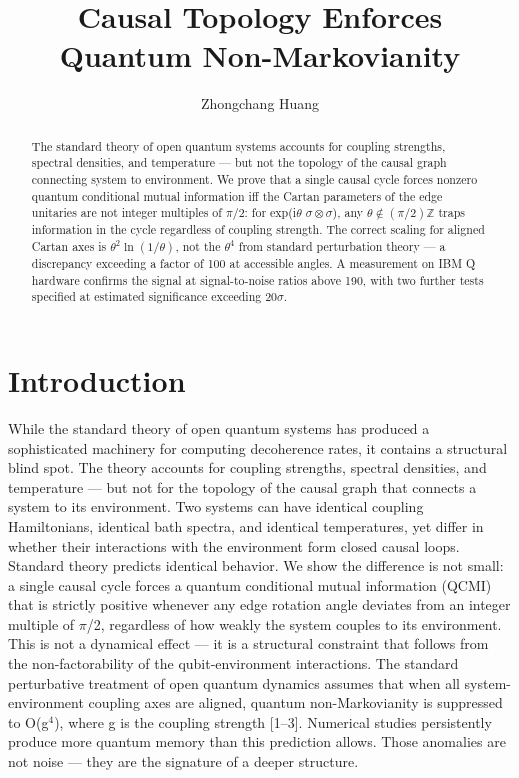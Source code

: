 \documentclass[twocolumn,aps,prl]{revtex4-2}
\begin{document}
\title{Causal Topology Enforces Quantum Non-Markovianity}

\author{Zhongchang Huang}


\begin{abstract}
The standard theory of open quantum systems accounts for coupling strengths, spectral densities, and temperature — but not the topology of the causal graph connecting system to environment. We prove that a single causal cycle forces nonzero quantum conditional mutual information iff the Cartan parameters of the edge unitaries are not integer multiples of $\pi$/2: for exp(i$\theta$ $\sigma\otimes\sigma$), any $\theta\notin(\pi/2)\mathbb{Z}$ traps information in the cycle regardless of coupling strength. The correct scaling for aligned Cartan axes is $\theta^2\ln(1/\theta)$, not the $\theta^4$ from standard perturbation theory — a discrepancy exceeding a factor of 100 at accessible angles. A measurement on IBM Q hardware confirms the signal at signal-to-noise ratios above 190, with two further tests specified at estimated significance exceeding 20$\sigma$.
\end{abstract}

\maketitle

\section{Introduction}

While the standard theory of open quantum systems has produced a sophisticated machinery for computing decoherence rates, it contains a structural blind spot. The theory accounts for coupling strengths, spectral densities, and temperature — but not for the topology of the causal graph that connects a system to its environment. Two systems can have identical coupling Hamiltonians, identical bath spectra, and identical temperatures, yet differ in whether their interactions with the environment form closed causal loops. Standard theory predicts identical behavior. We show the difference is not small: a single causal cycle forces a quantum conditional mutual information (QCMI) that is strictly positive whenever any edge rotation angle deviates from an integer multiple of $\pi$/2, regardless of how weakly the system couples to its environment. This is not a dynamical effect — it is a structural constraint that follows from the non-factorability of the qubit-environment interactions. The standard perturbative treatment of open quantum dynamics assumes that when all system-environment coupling axes are aligned, quantum non-Markovianity is suppressed to O(g$^4$), where g is the coupling strength [1–3]. Numerical studies persistently produce more quantum memory than this prediction allows. Those anomalies are not noise — they are the signature of a deeper structure.
\end{document}
